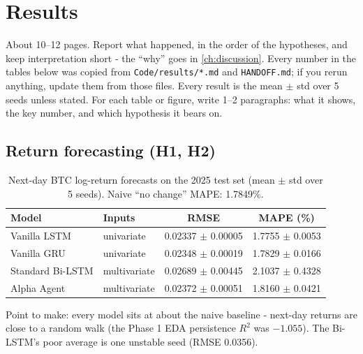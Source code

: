 \chapter{Results}\label{ch:results}

\begin{guide}
About 10--12 pages. Report what happened, in the order of the hypotheses, and keep interpretation short - the ``why'' goes in \cref{ch:discussion}. Every number in the tables below was copied from \texttt{Code/results/*.md} and \texttt{HANDOFF.md}; if you rerun anything, update them from those files. Every result is the mean $\pm$ std over 5 seeds unless stated. For each table or figure, write 1--2 paragraphs: what it shows, the key number, and which hypothesis it bears on.
\end{guide}

\section{Return forecasting (H1, H2)}\label{sec:res-forecast}

\begin{table}[ht]
  \centering
  \caption{Next-day BTC log-return forecasts on the 2025 test set (mean $\pm$ std over 5 seeds). Naive ``no change'' MAPE: 1.7849\%.}
  \label{tab:phase2}
  \begin{tabular}{llcc}
    \toprule
    Model & Inputs & RMSE & MAPE (\%) \\
    \midrule
    Vanilla LSTM     & univariate   & 0.02337 $\pm$ 0.00005 & 1.7755 $\pm$ 0.0053 \\
    Vanilla GRU      & univariate   & 0.02348 $\pm$ 0.00019 & 1.7829 $\pm$ 0.0166 \\
    Standard Bi-LSTM & multivariate & 0.02689 $\pm$ 0.00445 & 2.1037 $\pm$ 0.4328 \\
    Alpha Agent      & multivariate & 0.02372 $\pm$ 0.00051 & 1.8160 $\pm$ 0.0421 \\
    \bottomrule
  \end{tabular}
\end{table}

\begin{guide}
Point to make: every model sits at about the naive baseline - next-day returns are close to a random walk (the Phase 1 EDA persistence $R^2$ was $-1.055$). The Bi-LSTM's poor average is one unstable seed (RMSE 0.0356).
\end{guide}

